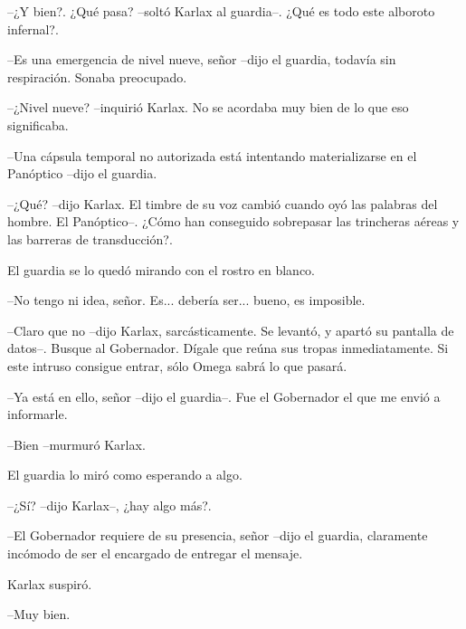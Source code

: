 --¿Y bien?. ¿Qué pasa? --soltó Karlax al guardia--. ¿Qué es todo este alboroto infernal?.

--Es una emergencia de nivel nueve, señor --dijo el guardia, todavía sin respiración. Sonaba preocupado.

--¿Nivel nueve? --inquirió Karlax.  No se acordaba muy bien de lo que eso significaba.

--Una cápsula temporal no autorizada está intentando materializarse en el Panóptico --dijo el guardia.

--¿Qué? --dijo Karlax. El timbre de su voz cambió cuando oyó las palabras del hombre. El Panóptico--. ¿Cómo han conseguido sobrepasar las trincheras aéreas y las barreras de transducción?. 

El guardia se lo quedó mirando con el rostro en blanco.

--No tengo ni idea, señor. Es... debería ser... bueno, es imposible.

--Claro que no --dijo Karlax, sarcásticamente. Se levantó, y apartó su pantalla de datos--. Busque al Gobernador. Dígale que reúna sus tropas inmediatamente. Si este intruso consigue entrar, sólo Omega sabrá lo que pasará.

--Ya está en ello, señor --dijo el guardia--. Fue el Gobernador el que me envió a informarle.

--Bien --murmuró Karlax.

El guardia lo miró como esperando a algo.

--¿Sí? --dijo Karlax--, ¿hay algo más?.

--El Gobernador requiere de su presencia, señor --dijo el guardia, claramente incómodo de ser el encargado de entregar el mensaje.

Karlax suspiró.

--Muy bien.

